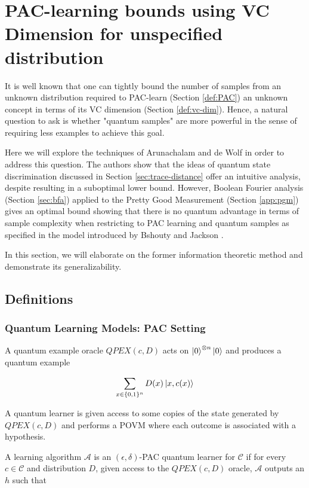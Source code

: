 \documentclass[main.tex]{subfiles}
\begin{document}
\section{PAC-learning bounds using VC Dimension for unspecified distribution}

It is well known that one can tightly bound the number of samples from an unknown distribution required to PAC-learn (Section \ref{def:PAC}) an unknown concept in terms of its VC dimension (Section \ref{def:vc-dim}). Hence, a natural question to ask is whether "quantum samples" are more powerful in the sense of requiring less examples to achieve this goal.

Here we will explore the techniques of Arunachalam and de Wolf \cite{arunachalam2016optimal} in order to address this question. The authors show that the ideas of quantum state discrimination discussed in Section \ref{sec:trace-distance} offer an intuitive analysis, despite resulting in a suboptimal lower bound. However, Boolean Fourier analysis (Section \ref{sec:bfa}) applied to the Pretty Good Measurement (Section \ref{app:pgm}) gives an optimal bound showing that there is no quantum advantage in terms of sample complexity when restricting to PAC learning and quantum samples as specified in the model introduced by Bshouty and Jackson \cite{bshouty1998learning}.

In this section, we will elaborate on the former information theoretic method and demonstrate its generalizability.

\subsection{Definitions}

\subsubsection{Quantum Learning Models: PAC Setting}

A quantum example oracle $QPEX(c,D)$ acts on $\ket{0}^{\otimes n}\ket{0}$ and produces a quantum example 

\begin{align}
\sum_{x\in\{0,1\}^n} D(x)\ket{x,c(x)}	
\end{align}

A quantum learner is given access to some copies of the state generated by $QPEX(c,D)$ and performs a POVM where each outcome is associated with a hypothesis. 

A learning algorithm $\mathcal{A}$ is an $(\epsilon, \delta)$-PAC quantum learner for $\mathcal{C}$ if for every $c \in \mathcal{C}$ and distribution $D$, given access to the $QPEX(c,D)$ oracle, $\mathcal{A}$ outputs an $h$ such that 
\end{document}
